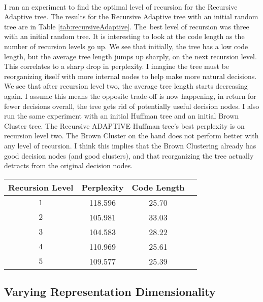 \paragraph{}
I ran an experiment to find the optimal level of recursion for the Recursive Adaptive tree. The results for the Recursive Adaptive tree with an initial random tree are in Table \ref{tab:recursiveAdaptive}. The~best level of recursion was three with an initial random tree. It is interesting to look at the code length as the number of recursion levels go up. We see that initially, the tree has a low code length, but the average tree length jumps up sharply, on the next recursion level. This correlates to a sharp drop in perplexity. I imagine the tree must be reorganizing itself with more internal nodes to help make more natural decisions. We see that after recursion level two, the average tree length starts decreasing again. I assume this means the opposite trade-off is now happening, in return for fewer decisions overall, the tree gets rid of potentially useful decision nodes. I also run the same experiment with an initial Huffman tree and an initial Brown Cluster tree. The Recursive ADAPTIVE Huffman tree's best perplexity is on recursion level two. The Brown Cluster on the hand does not perform better with any level of recursion. I think this implies that the Brown Clustering already has good decision nodes (and good clusters), and that reorganizing the tree actually detracts from the original decision nodes.
\begin{table*} \centering
{}
\begin{tabular}{@{}cccc@{}}\toprule
Recursion Level & Perplexity & Code Length\\ 
\midrule
$1$ & 118.596 & 25.70\\
$2$ & 105.981 & 33.03\\
$3$ & 104.583 & 28.22\\
$4$ & 110.969 & 25.61\\
$5$ & 109.577 & 25.39\\
\bottomrule
\end{tabular}
\caption{The effect of more recursion levels on the Recursive ADAPTIVE tree with an initial random tree}
\label{tab:recursiveAdaptive}
\end{table*}

\subsection{Varying Representation Dimensionality}
